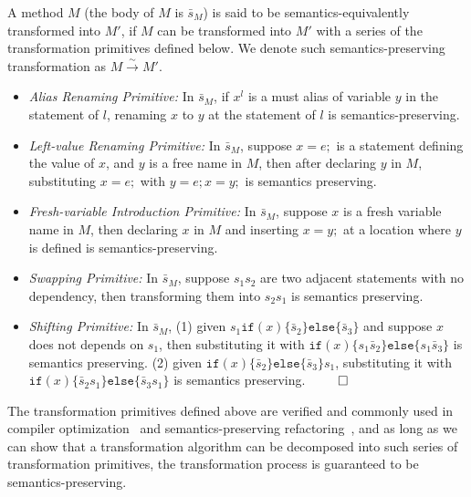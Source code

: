 \documentclass[a4paper, USenglish]{lipics-v2016}
\theoremstyle{plain}
\begin{document}
\begin{definition}
\label{def:semantics-preserving}
A method $M$ (the body of $M$ is $\bar{s}_M$) is said to be semantics-equivalently transformed into $M'$, if $M$ can be transformed into $M'$ with a series of the transformation primitives defined below. We denote such semantics-preserving transformation as $M\xrightarrow{\sim}M'$.
\begin{itemize}
\item \textit{Alias Renaming Primitive:} In $\bar{s}_M$, if $x^l$ is a must alias of variable $y$ in the statement of $l$,
  renaming $x$ to $y$ at the statement of $l$ is semantics-preserving.
\item \textit{Left-value Renaming Primitive:} In $\bar{s}_M$, suppose $x=e;$ is a statement defining the value of $x$, and $y$ is a free name in $M$, then after declaring $y$ in $M$, substituting $x=e;$ with $y=e; x=y;$ is semantics preserving.
\item \textit{Fresh-variable Introduction Primitive:} In $\bar{s}_M$, suppose $x$ is a fresh variable name in $M$, then declaring $x$ in $M$ and inserting $x=y;$ at a location where $y$ is defined is semantics-preserving.
\item \textit{Swapping Primitive:} In $\bar{s}_M$, suppose $s_1s_2$
  are two adjacent statements with no dependency, then transforming them into $s_2s_1$ is semantics preserving.
\item \textit{Shifting Primitive:} In $\bar{s}_M$, (1) given $s_1\mathtt{if}(x)\{\bar{s}_2\}\mathtt{else}\{\bar{s}_3\}$ and suppose $x$ does not depends on $s_1$, then substituting it with $\mathtt{if}(x)\{s_1\bar{s}_2\}\mathtt{else}\{s_1\bar{s}_3\}$ is semantics preserving.  (2) given $\mathtt{if}(x)\{\bar{s}_2\}\mathtt{else}\{\bar{s}_3\}s_1$, substituting it with $\mathtt{if}(x)\{\bar{s}_2s_1\}\mathtt{else}\{\bar{s}_3s_1\}$ is semantics preserving.~\hfill $\qed$
\end{itemize}
\end{definition}

The transformation primitives defined above are verified and commonly used in compiler optimization~\cite{Wegman:1991:CPC:103135.103136,Aho:2006:CPT:1177220,Callahan:1986:ICP:12276.13327,DBLP:conf/sefm/KanadeSK06} and semantics-preserving refactoring~\cite{Schafer:2008:SER:1449764.1449787,Opdyke:1992:ROF:169783,Roberts:1999:PAR:929806}, and as long as we can show that a transformation algorithm can be decomposed into such series of transformation primitives, the transformation process is guaranteed to be semantics-preserving.
\end{document}
